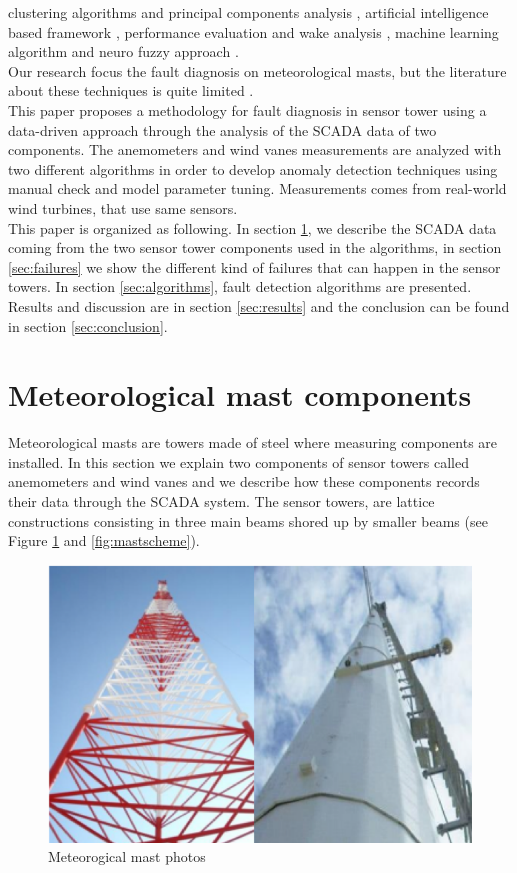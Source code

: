 \documentclass[conference]{IEEEtran}
\begin{document}
clustering algorithms and principal components analysis \cite{kim2011use}, artificial intelligence based framework \cite{wang2014scada}, performance evaluation and wake analysis \cite{astolfi2016mathematical}, machine learning algorithm \cite{kusiak2011prediction,schlechtingen2011comparative} and neuro fuzzy approach \cite{schlechtingen2012condition}.\\
Our research focus the fault diagnosis on meteorological masts,   
but the literature about these techniques is quite limited \cite{hasu2006weather} .\\
This paper proposes a methodology for fault diagnosis in sensor tower using a data-driven approach through the analysis of the SCADA data of two components. The anemometers and wind vanes measurements are analyzed with two different algorithms in order to develop anomaly detection techniques using manual check and model parameter tuning. Measurements comes from real-world wind turbines, that use same sensors.  \\
This paper is organized as following. In section \ref{sec:sensortower}, we describe the SCADA data coming from the two sensor tower components used in the algorithms, in section \ref{sec:failures} we show the different kind of failures that can happen in the sensor towers. In section \ref{sec:algorithms}, fault detection algorithms are presented. Results and discussion are in section \ref{sec:results} and the conclusion can be found in section \ref{sec:conclusion}.

\section{Meteorological mast components}\label{sec:sensortower}
Meteorological masts are towers made of steel where measuring components are installed. In this section we explain two components of sensor towers called anemometers and wind vanes and we describe how these components records their data through the SCADA system.
The sensor towers, are  lattice constructions consisting in three main beams shored up by smaller beams (see Figure \ref{fig:mastphoto} and \ref{fig:mastscheme}). 
\begin{figure}[h]
	\centering
	\includegraphics[width=\columnwidth]{Images/MeteorologicalMast.png}
	\caption{Meteorogical mast photos}
	\label{fig:mastphoto}
\end{figure}
\end{document}
